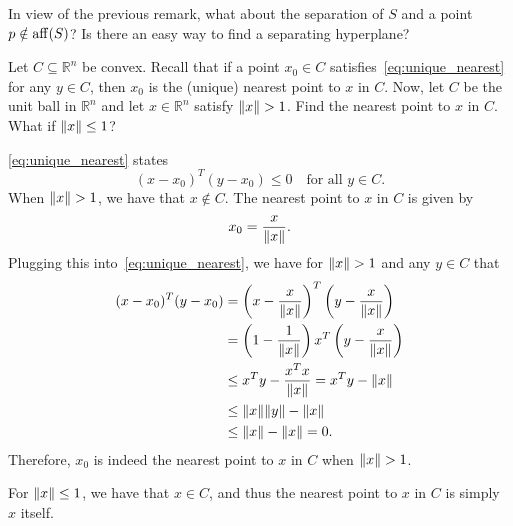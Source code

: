 \begin{exercise}
  In view of the previous remark, what about the separation of $S$ and a point $p \notin \operatorname*{aff}(S)$?
  Is there an easy way to find a separating hyperplane?
\end{exercise}

\begin{solution}

\end{solution}

\begin{exercise}
  Let $C \subseteq \mathbb{R}^n$ be convex.
  Recall that if a point $x_0 \in C$ satisfies~\eqref{eq:unique_nearest} for any $y \in C$, then $x_0$ is the (unique) nearest point to $x$ in $C$.
  Now, let $C$ be the unit ball in $\mathbb{R}^n$ and let $x \in \mathbb{R}^n$ satisfy $\lVert x\rVert > 1$.
  Find the nearest point to $x$ in $C$.
  What if $\lVert x\rVert \leq 1$?
\end{exercise}

\begin{solution}
  \eqref{eq:unique_nearest} states %
  \begin{equation}\label{eq:unique_nearest}
    (x - x_0)^T (y - x_0) \leq 0 \quad \text{for all } y \in C. \tag{3.2}
  \end{equation}
  When $\lVert x\rVert > 1$, we have that $x \notin C$.
  The nearest point to $x$ in $C$ is given by
  \begin{equation}
    x_0 = \frac{x}{\lVert x\rVert}.
  \end{equation}
  Plugging this into~\eqref{eq:unique_nearest}, we have for $\lVert x\rVert > 1$ and any $y \in C$ that
  \begin{equation}
    \begin{split}
      (x - x_0)^T (y - x_0) &= \left(x - \frac{x}{\lVert x\rVert}\right)^T \left(y - \frac{x}{\lVert x\rVert}\right) \\
      &= \left(1 - \frac{1}{\lVert x\rVert}\right) x^T \left(y - \frac{x}{\lVert x\rVert}\right) \\
      &\leq x^T y - \frac{x^T x}{\lVert x\rVert}
      = x^T y - \lVert x\rVert \\
      &\leq \lVert x\rVert \lVert y\rVert - \lVert x\rVert \\
      &\leq \lVert x\rVert - \lVert x\rVert
      = 0.
    \end{split}
  \end{equation}
  Therefore, $x_0$ is indeed the nearest point to $x$ in $C$ when $\lVert x\rVert > 1$.

  For $\lVert x\rVert \leq 1$, we have that $x \in C$, and thus the nearest point to $x$ in $C$ is simply $x$ itself.
\end{solution}

